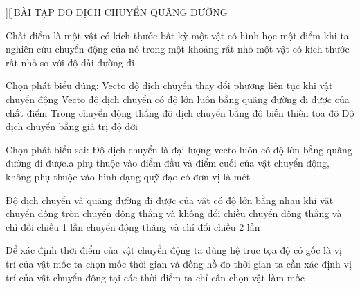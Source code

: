 \documentclass[Main.tex]{subfiles}
\begin{document}
	\Noibat[][\myfont[17]{qag}][\faBank]{BÀI TẬP ĐỘ DỊCH CHUYỂN QUÃNG ĐƯỜNG}
	\vspace{3mm}
	\begin{ex}
		[NB] Chất điểm là
		\choice
		{một vật có kích thước bất kỳ}
		{một vật có hình học}
		{một điểm khi ta nghiên cứu chuyển động của nó trong một khoảng rất nhỏ}
		{một vật có kích thước rất nhỏ so với độ dài đường đi}
		\loigiai{}
	\end{ex}
	
	\begin{ex}
		[NB] Chọn phát biểu đúng:
		\choice
		{Vecto độ dịch chuyển thay đổi phương liên tục khi vật chuyển động}
		{Vecto độ dịch chuyển có độ lớn luôn bằng quãng đường đi được của chất điểm}
		{Trong chuyển động thẳng độ dịch chuyển bằng độ biến thiên tọa độ}
		{Độ dịch chuyển bằng giá trị độ dời}
		\loigiai{}
	\end{ex}
	
	\begin{ex}
		[NB] Chọn phát biểu sai: Độ dịch chuyển
		\choice
		{là đại lượng vecto}
		{luôn có độ lớn bằng quãng đường đi được.a}
		{phụ thuộc vào điểm đầu và điểm cuối của vật chuyển động, không phụ thuộc vào hình dạng quỹ đạo}
		{có đơn vị là mét}
		\loigiai{}
	\end{ex}
	
	\begin{ex}
		[NB] Độ dịch chuyển và quãng đường đi được của vật có độ lớn bằng nhau khi vật
		\choice
		{chuyển động tròn}
		{chuyển động thẳng và không đổi chiều}
		{chuyển động thẳng và chỉ đổi chiều 1 lần}
		{chuyển động thẳng và chỉ đổi chiều 2 lần}
		\loigiai{}
	\end{ex}
	
	\begin{ex}
		[NB] Để xác định thời điểm của vật chuyển động
		\choice
		{ta dùng hệ trục tọa độ có gốc là vị trí của vật mốc}
		{ta chọn mốc thời gian và đồng hồ đo thời gian}
		{ta cần xác định vị trí của vật chuyển động tại các thời điểm}
		{ta chỉ cần chọn vật làm mốc}
		\loigiai{}
	\end{ex}
	
\end{document}
